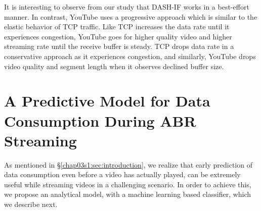 It is interesting to observe from our study that DASH-IF works in a best-effort manner. In contrast, YouTube uses a progressive approach which is similar to the elastic behavior of \ac{TCP} traffic.  Like \ac{TCP} increases the data rate until it experiences congestion, YouTube goes for higher quality video and higher streaming rate until the receive buffer is steady. \ac{TCP} drops data rate in a conservative approach as it experiences congestion, and similarly, YouTube drops video quality and segment length when it observes declined buffer size.


\section{A Predictive Model for Data Consumption During ABR Streaming}
\label{chap03s1:sec:model}

As mentioned in \S\ref{chap03s1:sec:introduction}, we realize that early prediction of data consumption even before a video has actually played, can be extremely useful while streaming videos in a challenging scenario.
In order to achieve this, we propose an analytical model, with a machine learning based classifier, which we describe next.

